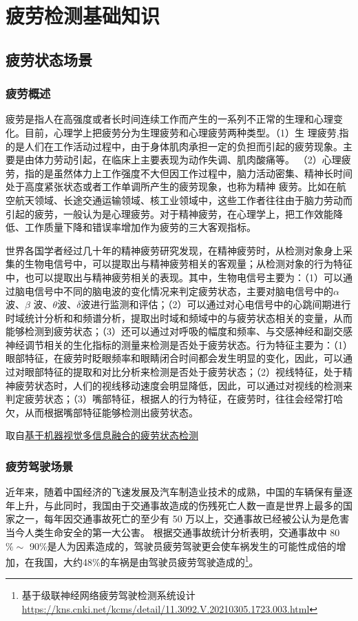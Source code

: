 \chapter{疲劳检测基础知识}

\section{疲劳状态场景}

\subsection{疲劳概述}

疲劳是指人在高强度或者长时间连续工作而产生的一系列不正常的生理和心理变化。目前，心理学上把疲劳分为生理疲劳和心理疲劳两种类型。（1）生
理疲劳,指的是人们在工作活动过程中，由于身体肌肉承担一定的负担而引起的疲劳现象。主要是由体力劳动引起，在临床上主要表现为动作失调、肌肉酸痛等。
（2）心理疲劳，指的是虽然体力上工作强度不大但因工作过程中，脑力活动密集、精神长时间处于高度紧张状态或者工作单调所产生的疲劳现象，也称为精神
疲劳。比如在航空航天领域、长途交通运输领域、核工业领域中，这些工作者往往由于脑力劳动而引起的疲劳，一般认为是心理疲劳。对于精神疲劳，在心理学上，把工作效能降低、工作质量下降和错误率增加作为疲劳的三大客观指标。

世界各国学者经过几十年的精神疲劳研究发现，在精神疲劳时，从检测对象身上采集的生物电信号中，可以提取出与精神疲劳相关的客观量；从检测对象的行为特征中，也可以提取出与精神疲劳相关的表现。其中，生物电信号主要为：（1）可以通过脑电信号中不同的脑电波的变化情况来判定疲劳状态，主要对脑电信号中的$\alpha$波、$\beta$ 波、$\theta$波、$\delta$波进行监测和评估；（2）可以通过对心电信号中的心跳间期进行时域统计分析和和频谱分析，提取出时域和频域中的与疲劳状态相关的变量，从而能够检测到疲劳状态；（3）还可以通过对呼吸的幅度和频率、与交感神经和副交感神经调节相关的生化指标的测量来检测是否处于疲劳状态。行为特征主要为：（1）眼部特征，在疲劳时眨眼频率和眼睛闭合时间都会发生明显的变化，因此，可以通过对眼部特征的提取和对比分析来检测是否处于疲劳状态；（2）视线特征，处于精神疲劳状态时，人们的视线移动速度会明显降低，因此，可以通过对视线的检测来判定疲劳状态；（3）嘴部特征，根据人的行为特征，在疲劳时，往往会经常打哈欠，从而根据嘴部特征能够检测出疲劳状态。

取自\href{https://xueshu.baidu.com/usercenter/paper/show?paperid=1g4g0jv02n7k0eg05g4b08t0tu163338&site=xueshu_se}{基于机器视觉多信息融合的疲劳状态检测}

\subsection{疲劳驾驶场景}
近年来，随着中国经济的飞速发展及汽车制造业技术的成熟，中国的车辆保有量逐年上升，与此同时，我国由于交通事故造成的伤残死亡人数一直是世界上最多的国家之一，每年因交通事故死亡的至少有 50 万以上，交通事故已经被公认为是危害当今人类生命安全的第一大公害。
根据交通事故统计分析表明，交通事故中 80$\% \sim$ 90$\%$是人为因素造成的，驾驶员疲劳驾驶更会使车祸发生的可能性成倍的增加，在我国，大约48$\%$的车祸是由驾驶员疲劳驾驶造成的\footnote{基于级联神经网络疲劳驾驶检测系统设计 \quad \url{https://kns.cnki.net/kcms/detail/11.3092.V.20210305.1723.003.html}}。

